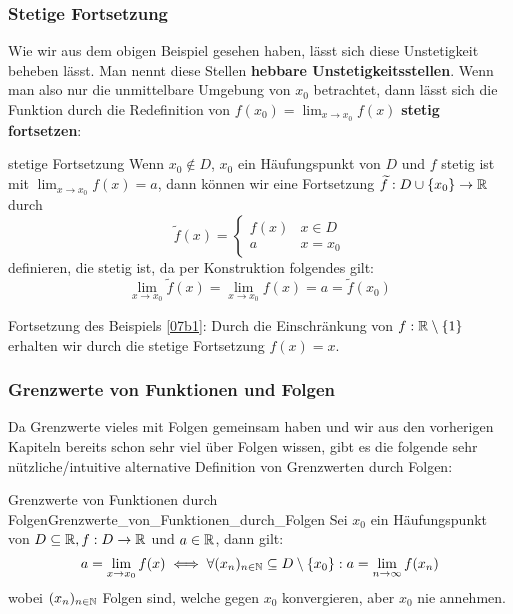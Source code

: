 \subsubsection{Stetige Fortsetzung}

Wie wir aus dem obigen Beispiel gesehen haben, lässt sich diese Unstetigkeit beheben lässt. Man nennt diese Stellen \textbf{hebbare Unstetigkeitsstellen}. Wenn man also nur die unmittelbare Umgebung von $x_0$ betrachtet, dann lässt sich die Funktion durch die Redefinition von $f(x_0) = \lim_{x \to x_0}{f(x)}$ \textbf{stetig fortsetzen}:

\begin{definition}{stetige Fortsetzung}{}
Wenn $x_0 \notin D$, $x_0$ ein Häufungspunkt von $D$ und $f$ stetig ist mit $\lim_{x \to x_0}{f(x)} = a$, dann können wir eine Fortsetzung $\widetilde{f}: D \cup \{x_0\} \to \mathbb{R}$ durch
$$\widetilde{f}(x)=\begin{cases}f(x) & x \in D\\a & x = x_0\end{cases}$$
definieren, die stetig ist, da per Konstruktion folgendes gilt: $$\lim_{x \to x_0}{\widetilde{f}(x)} = \lim_{x \to x_0}{f(x)} = a = \widetilde{f}(x_0)$$
\end{definition}

\begin{example} Fortsetzung des Beispiels \ref{07b1}: Durch die Einschränkung von $f: \mathbb{R} \setminus \{1\}$ erhalten wir durch die stetige Fortsetzung $f(x) = x$.
\end{example}

\subsubsection{Grenzwerte von Funktionen und Folgen}

Da Grenzwerte vieles mit Folgen gemeinsam haben und wir aus den vorherigen Kapiteln bereits schon sehr viel über Folgen wissen, gibt es die folgende sehr nützliche/intuitive alternative Definition von Grenzwerten durch Folgen:

\begin{lemma}{Grenzwerte von Funktionen durch Folgen}{Grenzwerte_von_Funktionen_durch_Folgen}
Sei $x_0$ ein Häufungspunkt von $D \subseteq \mathbb{R}, f: D \to \mathbb{R}$ und $a\in \mathbb{R}$, dann gilt:
$$a = \lim_{x \to x_0} f(x) \iff \forall (x_n)_{n \in \mathbb{N}} \subseteq D \setminus \{x_0\}: a = \lim_{n \to \infty}{f(x_n)}$$
wobei $(x_n)_{n \in \mathbb{N}}$ Folgen sind, welche gegen $x_0$ konvergieren, aber $x_0$ nie annehmen.
\end{lemma}

